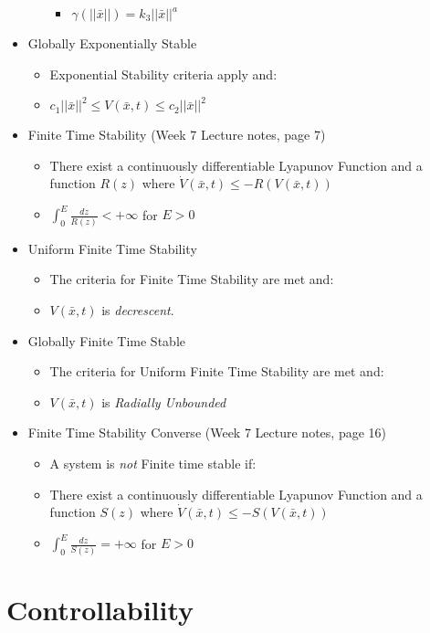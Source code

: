 \documentclass[12pt]{article}
\begin{document}
\begin{itemize}
\begin{itemize}
\begin{itemize}
		\item $\gamma(||\bar{x}||)=k_3||\bar{x}||^a$
		\end{itemize}
	\end{itemize}
\item Globally Exponentially Stable
	\begin{itemize}
	\item Exponential Stability criteria apply and:
	\item $c_1||\bar{x}||^2\leq V(\bar{x},t)\leq c_2||\bar{x}||^2$
	\end{itemize}
\item Finite Time Stability (Week 7 Lecture notes, page 7)
	\begin{itemize}
	\item There exist a continuously differentiable Lyapunov Function and a function $R(z)$ where $\dot{V}(\bar{x},t)\leq-R(V(\bar{x},t))$
	\item $\int_0^E\frac{dz}{R(z)}<+\infty$ for $E>0$
	\end{itemize}
\item Uniform Finite Time Stability
	\begin{itemize}
	\item The criteria for Finite Time Stability are met and: 
	\item $V(\bar{x},t)$ is {\em decrescent}.
	\end{itemize}
\item Globally Finite Time Stable 
	\begin{itemize}
	\item The criteria for Uniform Finite Time Stability are met and: 
	\item $V(\bar{x},t)$ is {\em Radially Unbounded}
	\end{itemize}
\item Finite Time Stability Converse (Week 7 Lecture notes, page 16)
	 \begin{itemize}
	 \item A system is {\em not} Finite time stable if:
	 \item There exist a continuously differentiable Lyapunov Function and a function $S(z)$ where $\dot{V}(\bar{x},t)\leq-S(V(\bar{x},t))$
	 \item $\int_0^E\frac{dz}{S(z)}=+\infty$ for $E>0$
	 \end{itemize}

\end{itemize}

\newpage
\section*{Controllability}
\end{document}
